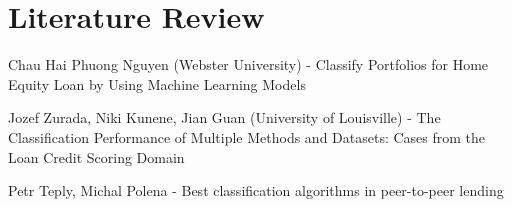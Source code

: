 \chapter{Literature Review}
\label{chap:three}

Chau Hai Phuong Nguyen (Webster University) - Classify Portfolios for Home Equity Loan by Using Machine Learning Models

Jozef Zurada, Niki Kunene, Jian Guan (University of Louisville) - The Classification Performance of Multiple Methods and
Datasets: Cases from the Loan Credit Scoring Domain

Petr Teply, Michal Polena - Best classification algorithms in peer-to-peer lending
